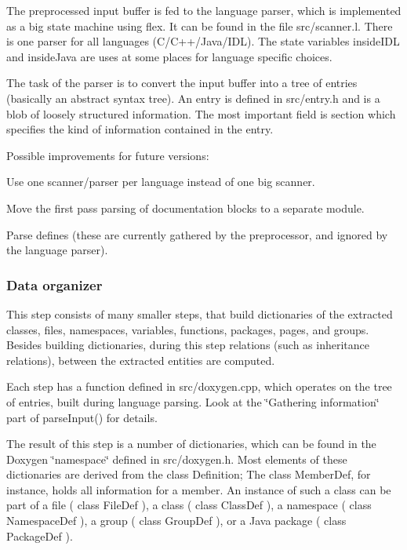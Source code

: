 The preprocessed input buffer is fed to the language parser, which is implemented as a big state machine using {\ttfamily flex}. It can be found in the file {\ttfamily src/scanner.l}. There is one parser for all languages (C/C++/Java/IDL). The state variables {\ttfamily insideIDL} and {\ttfamily insideJava} are uses at some places for language specific choices.

The task of the parser is to convert the input buffer into a tree of entries (basically an abstract syntax tree). An entry is defined in {\ttfamily src/entry.h} and is a blob of loosely structured information. The most important field is {\ttfamily section} which specifies the kind of information contained in the entry.

Possible improvements for future versions:
\begin{DoxyItemize}
\item Use one scanner/parser per language instead of one big scanner.
\item Move the first pass parsing of documentation blocks to a separate module.
\item Parse defines (these are currently gathered by the preprocessor, and ignored by the language parser).
\end{DoxyItemize}

\subsubsection*{Data organizer}

This step consists of many smaller steps, that build dictionaries of the extracted classes, files, namespaces, variables, functions, packages, pages, and groups. Besides building dictionaries, during this step relations (such as inheritance relations), between the extracted entities are computed.

Each step has a function defined in {\ttfamily src/doxygen.cpp}, which operates on the tree of entries, built during language parsing. Look at the \char`\"{}Gathering information\char`\"{} part of {\ttfamily parseInput()} for details.

The result of this step is a number of dictionaries, which can be found in the Doxygen \char`\"{}namespace\char`\"{} defined in {\ttfamily src/doxygen.h}. Most elements of these dictionaries are derived from the class {\ttfamily Definition}; The class {\ttfamily MemberDef}, for instance, holds all information for a member. An instance of such a class can be part of a file ( class {\ttfamily FileDef} ), a class ( class {\ttfamily ClassDef} ), a namespace ( class {\ttfamily NamespaceDef} ), a group ( class {\ttfamily GroupDef} ), or a Java package ( class {\ttfamily PackageDef} ).

